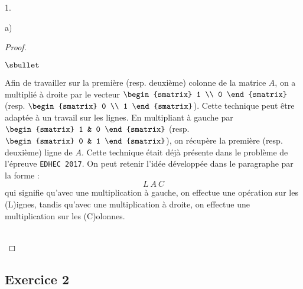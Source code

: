 \documentclass[11pt]{article}%
\begin{document}
\begin{noliste}{1.}
\begin{noliste}{a)}
\begin{proof}
\begin{remark}
\begin{noliste}{$\sbullet$}
        \item Afin de travailler sur la première (resp. deuxième)
          colonne de la matrice $A$, on a multiplié à droite par le
          vecteur $
          \begin{smatrix}
            1 \\
            0
          \end{smatrix}
          $ (resp. $\begin{smatrix}
            0 \\
            1
          \end{smatrix}
          $). Cette technique peut être adaptée à un travail sur les
          lignes. En multipliant à gauche par $
          \begin{smatrix}
            1 & 0
          \end{smatrix}
          $ (resp. $ 
          \begin{smatrix} 
            0 & 1
          \end{smatrix}
          $), on récupère la première (resp. deuxième) ligne de
          $A$. Cette technique était déjà présente dans le problème de
          l'épreuve {\tt EDHEC 2017}. On peut retenir l'idée
          développée dans le paragraphe par la forme : 
          \[
          L \ A \ C
          \]
          qui signifie qu'avec une multiplication à gauche, on
          effectue une opération sur les (L)ignes, tandis qu'avec une
          multiplication à droite, on effectue une multiplication sur
          les (C)olonnes.
        \end{noliste}
      \end{remark}~\\[-1.4cm]
    \end{proof}
  \end{noliste}
\end{noliste}


\newpage


\subsection*{Exercice 2}
\end{document}
